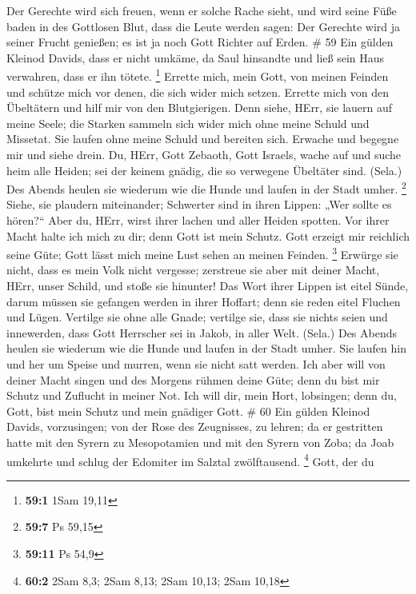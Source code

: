  Der Gerechte wird sich freuen, wenn er solche Rache sieht,
und wird seine Füße baden in des Gottlosen Blut,  dass die
Leute werden sagen: Der Gerechte wird ja seiner Frucht genießen; es ist
ja noch Gott Richter auf Erden. \# 59  Ein gülden Kleinod
Davids, dass er nicht umkäme, da Saul hinsandte und ließ sein Haus
verwahren, dass er ihn tötete. \footnote{\textbf{59:1} 1Sam 19,11}
 Errette mich, mein Gott, von meinen Feinden und schütze
mich vor denen, die sich wider mich setzen.  Errette mich
von den Übeltätern und hilf mir von den Blutgierigen.  Denn
siehe, HErr, sie lauern auf meine Seele; die Starken sammeln sich wider
mich ohne meine Schuld und Missetat.  Sie laufen ohne meine
Schuld und bereiten sich. Erwache und begegne mir und siehe drein.
 Du, HErr, Gott Zebaoth, Gott Israels, wache auf und suche
heim alle Heiden; sei der keinem gnädig, die so verwegene Übeltäter
sind. (Sela.)  Des Abends heulen sie wiederum wie die Hunde
und laufen in der Stadt umher. \footnote{\textbf{59:7} Ps 59,15}
 Siehe, sie plaudern miteinander; Schwerter sind in ihren
Lippen: „Wer sollte es hören?{}``  Aber du, HErr, wirst
ihrer lachen und aller Heiden spotten.  Vor ihrer Macht
halte ich mich zu dir; denn Gott ist mein Schutz.  Gott
erzeigt mir reichlich seine Güte; Gott lässt mich meine Lust sehen an
meinen Feinden. \footnote{\textbf{59:11} Ps 54,9}  Erwürge
sie nicht, dass es mein Volk nicht vergesse; zerstreue sie aber mit
deiner Macht, HErr, unser Schild, und stoße sie hinunter! 
Das Wort ihrer Lippen ist eitel Sünde, darum müssen sie gefangen werden
in ihrer Hoffart; denn sie reden eitel Fluchen und Lügen. 
Vertilge sie ohne alle Gnade; vertilge sie, dass sie nichts seien und
innewerden, dass Gott Herrscher sei in Jakob, in aller Welt. (Sela.)
 Des Abends heulen sie wiederum wie die Hunde und laufen in
der Stadt umher.  Sie laufen hin und her um Speise und
murren, wenn sie nicht satt werden.  Ich aber will von
deiner Macht singen und des Morgens rühmen deine Güte; denn du bist mir
Schutz und Zuflucht in meiner Not.  Ich will dir, mein
Hort, lobsingen; denn du, Gott, bist mein Schutz und mein gnädiger Gott.
\# 60  Ein gülden Kleinod Davids, vorzusingen; von der Rose
des Zeugnisses, zu lehren;  da er gestritten hatte mit den
Syrern zu Mesopotamien und mit den Syrern von Zoba; da Joab umkehrte und
schlug der Edomiter im Salztal zwölftausend. \footnote{\textbf{60:2}
  2Sam 8,3; 2Sam 8,13; 2Sam 10,13; 2Sam 10,18}  Gott, der du

